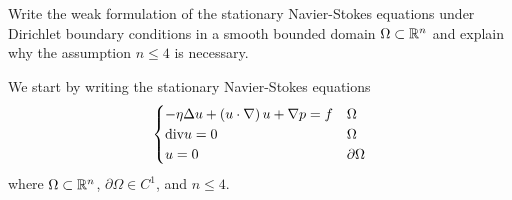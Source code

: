 \newpage
\begin{exercise}
    Write the weak formulation of the stationary Navier-Stokes equations under Dirichlet boundary conditions in a smooth bounded domain \(\Omega \subset \mathbb{R}^n\) and explain why the assumption \(n \leq 4\) is necessary.
\end{exercise}
We start by writing the stationary Navier-Stokes equations
\[
    \begin{cases}
        - \eta \Delta u + \left( u \cdot \nabla \right) u + \nabla p = f & \Omega         \\
        \text{div} u = 0                                                     & \Omega         \\
        u = 0                                                          & \partial\Omega
    \end{cases}
\]
where \(\Omega \subset \mathbb{R}^n\), \(\partial\Omega \in C^1\), and \(n \leq 4\).
